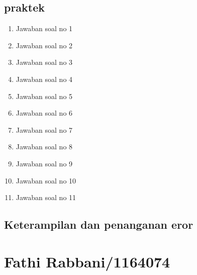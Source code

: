 \subsection{praktek}
\begin{enumerate}
    \item Jawaban soal no 1
    
    \item Jawaban soal no 2
    
    \item Jawaban soal no 3
    
    \item Jawaban soal no 4
    
    \item Jawaban soal no 5
    
    \item Jawaban soal no 6
    
    \item Jawaban soal no 7
    
    \item Jawaban soal no 8
    
    \item Jawaban soal no 9
    
    \item Jawaban soal no 10
    
    \item Jawaban soal no 11
    
\end{enumerate}

\subsection{Keterampilan dan penanganan eror}
    

\section{Fathi Rabbani/1164074}
